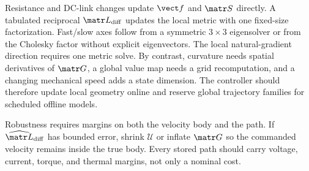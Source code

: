 Resistance and DC-link changes update \(\vect f\) and \(\matr S\) directly.
A tabulated reciprocal \(\matr L_{\mathrm{diff}}\) updates the local metric
with one fixed-size factorization.  Fast/slow axes follow from a symmetric
\(3\times3\) eigensolver or from the Cholesky factor without explicit
eigenvectors.  The local natural-gradient direction requires one metric solve.
By contrast, curvature needs spatial derivatives of \(\matr G\), a global
value map needs a grid recomputation, and a changing mechanical speed adds a
state dimension.  The controller should therefore update local geometry
online and reserve global trajectory families for scheduled offline models.

Robustness requires margins on both the velocity body and the path.  If
\(\widehat{\matr L}_{\mathrm{diff}}\) has bounded error, shrink
\(\mathcal U\) or inflate \(\matr G\) so the commanded velocity remains inside
the true body.  Every stored path should carry voltage, current, torque, and
thermal margins, not only a nominal cost.
